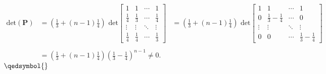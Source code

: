 \documentclass{exam}
\begin{document}
\begin{equation*}
    \begin{aligned}
        \displaystyle \text{det}(\pmb{\text{P}})
         &= (\frac{1}{3} + (n-1)\frac{1}{4})\text{ det}\begin{bmatrix}
            1 & 1 & \cdots & 1\\[1.2em]
           \frac{1}{4}  & \frac{1}{3}  & \cdots & \frac{1}{4} \\
           \vdots  & \vdots  & \ddots & \vdots  \\
           \frac{1}{4}  & \frac{1}{4}  & \cdots & \frac{1}{3} 
          \end{bmatrix}
         &= (\frac{1}{3} + (n-1)\frac{1}{4})\text{ det}\begin{bmatrix}
             1 & 1 & \cdots & 1\\[1.2em]
             0 & \frac{1}{3} - \frac{1}{4}   & \cdots & 0\\
            \vdots  & \vdots  & \ddots & \vdots  \\
            0 & 0  & \cdots & \frac{1}{3} - \frac{1}{4} 
           \end{bmatrix}\\
         \\
        &=(\frac{1}{3} + (n-1)\frac{1}{4})(\frac{1}{3} - \frac{1}{4})^{n-1} \neq 0.
    \end{aligned}
\end{equation*}\hspace{10cm}$\qedsymbol{}$
\end{document}
